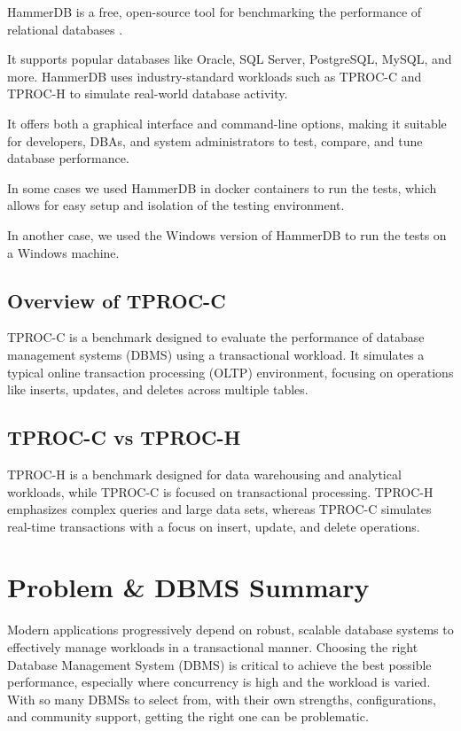 HammerDB is a free, open-source tool for benchmarking the performance of relational databases \cite{enwiki:1275860580}.

It supports popular databases like Oracle, SQL Server, PostgreSQL, MySQL, and more. HammerDB uses industry-standard workloads such as TPROC-C and TPROC-H to simulate real-world database activity.

It offers both a graphical interface and command-line options, making it suitable for developers, DBAs, and system administrators to test, compare, and tune database performance.

In some cases we used HammerDB in docker containers to run the tests, which allows for easy setup and isolation of the testing environment.

In another case, we used the Windows version of HammerDB to run the tests on a Windows machine.

\subsection{Overview of TPROC-C}
\label{sec:tproc-c}

TPROC-C is a benchmark designed to evaluate the performance of database management systems (DBMS) using a transactional workload. It simulates a typical online transaction processing (OLTP) environment, focusing on operations like inserts, updates, and deletes across multiple tables.

\subsection{TPROC-C vs TPROC-H}
\label{sec:tproc-c-vs-tproc-h}

TPROC-H is a benchmark designed for data warehousing and analytical workloads, while TPROC-C is focused on transactional processing. TPROC-H emphasizes complex queries and large data sets, whereas TPROC-C simulates real-time transactions with a focus on insert, update, and delete operations.

\section{Problem \& DBMS Summary}
\label{sec:problem}
Modern applications progressively depend on robust, scalable database systems to effectively manage workloads in a transactional manner. Choosing the right Database Management System (DBMS) is critical to achieve the best possible performance, especially where concurrency is high and the workload is varied. With so many DBMSs to select from, with their own strengths, configurations, and community support, getting the right one can be problematic.

